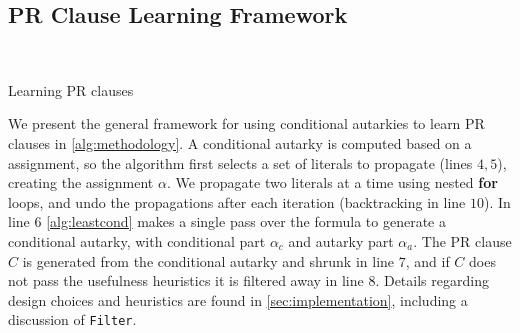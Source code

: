 
\subsection{PR Clause Learning Framework}~\label{subsec:methodology}

\begin{algorithm}\caption{Learning PR clauses}\label{alg:methodology}
    \SetAlgoNoLine {}
     
     
     
      
\end{algorithm}

We present the general framework for using conditional autarkies to learn PR
clauses in \autoref{alg:methodology}. A conditional autarky is computed based on
a assignment, so the algorithm first selects a set of literals to propagate
(lines $4,5$), creating the assignment $\alpha$. We propagate two literals at a
time using nested \textbf{for} loops, and undo the propagations after each
iteration (backtracking in line $10$). In line $6$ \autoref{alg:leastcond}
makes a single pass over the formula to generate a conditional autarky, with
conditional part $\alpha_c$ and autarky part $\alpha_a$. The PR clause $C$
is generated from the conditional autarky and shrunk in line $7$, and if $C$
does not pass the usefulness heuristics it is filtered away in line $8$. Details
regarding design choices and heuristics are found in
\autoref{sec:implementation}, including a discussion of \texttt{Filter}.

